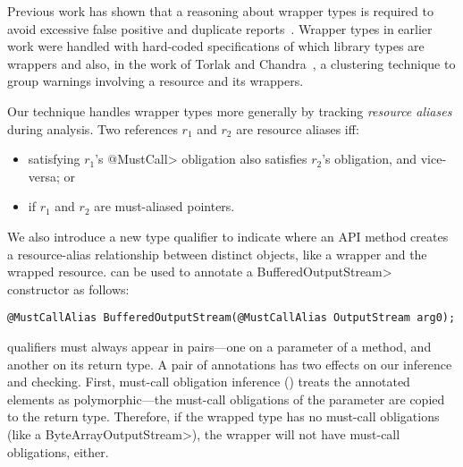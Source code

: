 Previous work has shown that a reasoning about wrapper types is
required to avoid excessive false positive and duplicate
reports~\cite{TorlakC10,ecj-resource-leak}.  Wrapper types in earlier
work were handled with hard-coded specifications of which library
types are wrappers and also, in the work of Torlak and
Chandra~\cite{TorlakC10}, a clustering technique to group warnings
involving a resource and its wrappers.

Our technique handles wrapper types more generally by tracking \emph{resource
aliases} during analysis.  Two references $r_1$ and $r_2$ are resource aliases
iff:
\begin{itemize}
\item satisfying $r_1$'s \<@MustCall> obligation also satisfies $r_2$'s
  obligation, and vice-versa; or
\item if $r_1$ and $r_2$ are must-aliased pointers.
\end{itemize}
We also introduce a new type
qualifier \mccannot to indicate where an API method creates a resource-alias
relationship between distinct objects, like a wrapper and the wrapped resource.
\mccannot can be used to annotate a \<BufferedOutputStream> constructor as follows:
\begin{lstlisting}
@MustCallAlias BufferedOutputStream(@MustCallAlias OutputStream arg0);
\end{lstlisting}

\mccannot qualifiers must always appear in pairs---one on a parameter
of a method, and another on its return type.  A pair of \mccannot
annotations has two effects on our inference and checking.  First,
must-call obligation inference () treats the
annotated elements as polymorphic---the must-call obligations of the
parameter are copied to the return type. Therefore, if the wrapped
type has no must-call obligations (like a \<ByteArrayOutputStream>),
the wrapper will not have must-call obligations, either.

